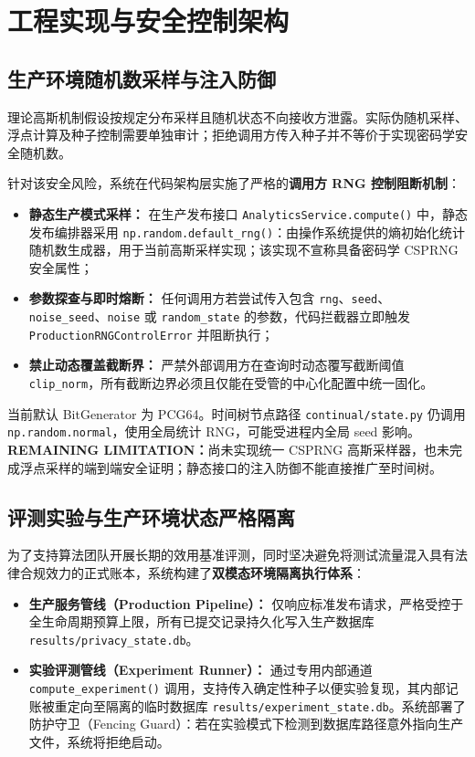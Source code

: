 \section{工程实现与安全控制架构}
\label{sec:engineering}

\subsection{生产环境随机数采样与注入防御}
理论高斯机制假设按规定分布采样且随机状态不向接收方泄露。实际伪随机采样、浮点计算及种子控制需要单独审计；拒绝调用方传入种子并不等价于实现密码学安全随机数。

针对该安全风险，系统在代码架构层实施了严格的\textbf{调用方 RNG 控制阻断机制}：
\begin{itemize}[leftmargin=2em]
  \item \textbf{静态生产模式采样：} 在生产发布接口 \texttt{AnalyticsService.compute()} 中，静态发布编排器采用 \texttt{np.random.default\_rng()}：由操作系统提供的熵初始化统计随机数生成器，用于当前高斯采样实现；该实现不宣称具备密码学 CSPRNG 安全属性；
  \item \textbf{参数探查与即时熔断：} 任何调用方若尝试传入包含 \texttt{rng}、\texttt{seed}、\texttt{noise\_seed}、\texttt{noise} 或 \texttt{random\_state} 的参数，代码拦截器立即触发 \texttt{ProductionRNGControlError} 并阻断执行；
  \item \textbf{禁止动态覆盖截断界：} 严禁外部调用方在查询时动态覆写截断阈值 \texttt{clip\_norm}，所有截断边界必须且仅能在受管的中心化配置中统一固化。
\end{itemize}

当前默认 BitGenerator 为 PCG64。时间树节点路径 \texttt{continual/state.py} 仍调用 \texttt{np.random.normal}，使用全局统计 RNG，可能受进程内全局 seed 影响。\textbf{REMAINING LIMITATION：}尚未实现统一 CSPRNG 高斯采样器，也未完成浮点采样的端到端安全证明；静态接口的注入防御不能直接推广至时间树。

\subsection{评测实验与生产环境状态严格隔离}
为了支持算法团队开展长期的效用基准评测，同时坚决避免将测试流量混入具有法律合规效力的正式账本，系统构建了\textbf{双模态环境隔离执行体系}：
\begin{itemize}[leftmargin=2em]
  \item \textbf{生产服务管线（Production Pipeline）：} 仅响应标准发布请求，严格受控于全生命周期预算上限，所有已提交记录持久化写入生产数据库 \texttt{results/privacy\_state.db}。
  \item \textbf{实验评测管线（Experiment Runner）：} 通过专用内部通道 \texttt{compute\_experiment()} 调用，支持传入确定性种子以便实验复现，其内部记账被重定向至隔离的临时数据库 \texttt{results/experiment\_state.db}。系统部署了防护守卫（Fencing Guard）：若在实验模式下检测到数据库路径意外指向生产文件，系统将拒绝启动。
\end{itemize}

